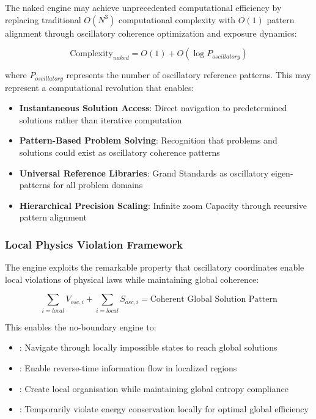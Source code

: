 \documentclass[11pt,a4paper]{article}
\theoremstyle{remark}
\begin{document}
The naked engine may achieve unprecedented computational efficiency by replacing traditional $O(N^3)$ computational complexity with $O(1)$ pattern alignment through oscillatory coherence optimization and exposure dynamics:

\begin{equation}
\text{Complexity}_{naked} = O(1) + O(\log P_{oscillatory})
\end{equation}

where $P_{oscillatory}$ represents the number of oscillatory reference patterns. This may represent a computational revolution that enables:

\begin{itemize}
\item \textbf{Instantaneous Solution Access}: Direct navigation to predetermined solutions rather than iterative computation
\item \textbf{Pattern-Based Problem Solving}: Recognition that problems and solutions could exist as oscillatory coherence patterns
\item \textbf{Universal Reference Libraries}: Grand Standards as oscillatory eigen-patterns for all problem domains
\item \textbf{Hierarchical Precision Scaling}: Infinite zoom Capacity through recursive pattern alignment
\end{itemize}

\subsubsection{Local Physics Violation Framework}

The engine exploits the remarkable property that oscillatory coordinates enable local violations of physical laws while maintaining global coherence:

\begin{equation}
\sum_{i=local} V_{osc,i} + \sum_{i=local} S_{osc,i} = \text{Coherent Global Solution Pattern}
\end{equation}

This enables the no-boundary engine to:

\begin{itemize}
  \item {}: Navigate through locally impossible states to reach global solutions
  \item {}: Enable reverse-time information flow in localized regions
  \item {}: Create local organisation while maintaining global entropy compliance
  \item {}: Temporarily violate energy conservation locally for optimal global efficiency
\end{itemize}
\end{document}

